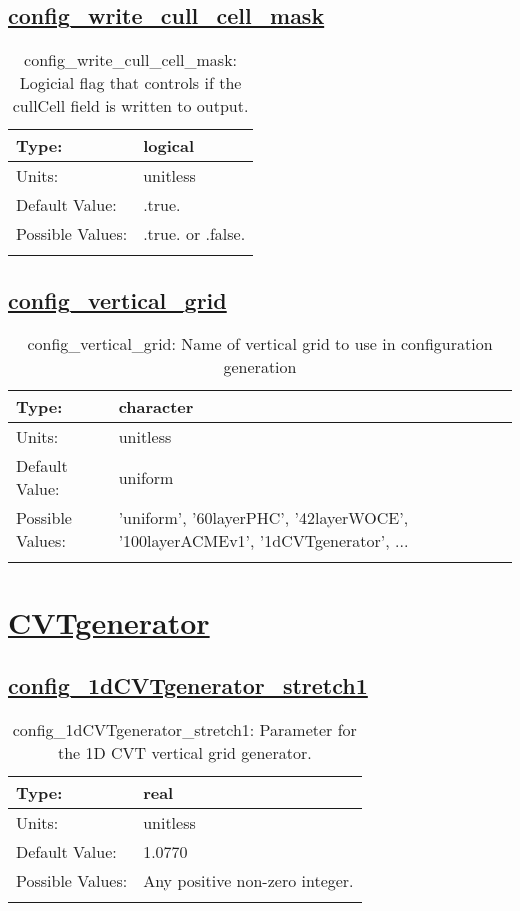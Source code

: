 \subsection[config\_write\_cull\_cell\_mask]{\hyperref[sec:nm_tab_init_setup]{config\_write\_cull\_cell\_mask}}
\label{subsec:nm_sec_config_write_cull_cell_mask}
\begin{center}
\begin{longtable}{| p{2.0in} || p{4.0in} |}
    \hline
    Type: & logical \\
    \hline
    Units: & \si{unitless} \\
    \hline
    Default Value: & .true. \\
    \hline
    Possible Values: & .true. or .false. \\
    \hline
    \caption{config\_write\_cull\_cell\_mask: Logicial flag that controls if the cullCell field is written to output.}
\end{longtable}
\end{center}
\subsection[config\_vertical\_grid]{\hyperref[sec:nm_tab_init_setup]{config\_vertical\_grid}}
\label{subsec:nm_sec_config_vertical_grid}
\begin{center}
\begin{longtable}{| p{2.0in} || p{4.0in} |}
    \hline
    Type: & character \\
    \hline
    Units: & \si{unitless} \\
    \hline
    Default Value: & uniform \\
    \hline
    Possible Values: & 'uniform', '60layerPHC', '42layerWOCE', '100layerACMEv1', '1dCVTgenerator', ... \\
    \hline
    \caption{config\_vertical\_grid: Name of vertical grid to use in configuration generation}
\end{longtable}
\end{center}
\section[CVTgenerator]{\hyperref[sec:nm_tab_CVTgenerator]{CVTgenerator}}
\label{sec:nm_sec_CVTgenerator}
\subsection[config\_1dCVTgenerator\_stretch1]{\hyperref[sec:nm_tab_CVTgenerator]{config\_1dCVTgenerator\_stretch1}}
\label{subsec:nm_sec_config_1dCVTgenerator_stretch1}
\begin{center}
\begin{longtable}{| p{2.0in} || p{4.0in} |}
    \hline
    Type: & real \\
    \hline
    Units: & \si{unitless} \\
    \hline
    Default Value: & 1.0770 \\
    \hline
    Possible Values: & Any positive non-zero integer. \\
    \hline
    \caption{config\_1dCVTgenerator\_stretch1: Parameter for the 1D CVT vertical grid generator.}
\end{longtable}
\end{center}
